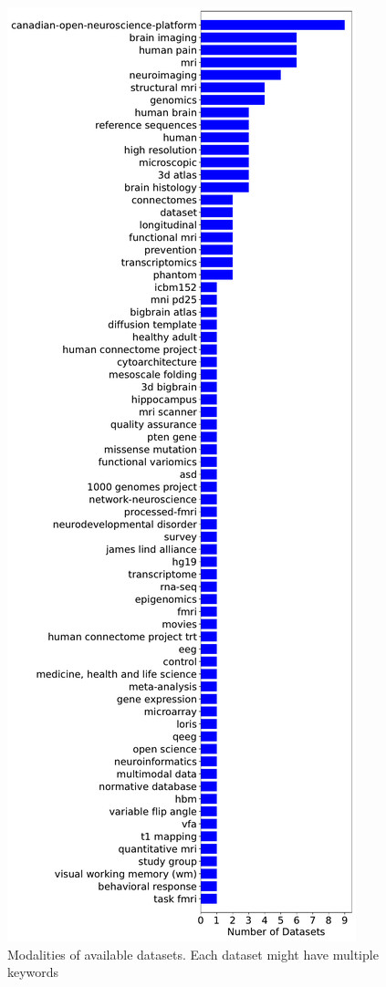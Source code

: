 \documentclass[conference]{IEEEtran}
\begin{document}
 \begin{figure}
  \includegraphics[width=\columnwidth]{figures/Datasets Keyword.pdf}
  \caption{Modalities of available datasets. Each dataset might have multiple keywords }
  \label{fig:datasets_modalities}
\end{figure}
\end{document}
